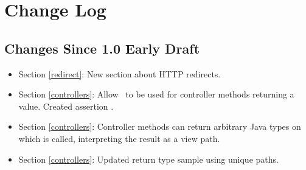 \chapter{Change Log}

\section{Changes Since 1.0 Early Draft}

\begin{itemize}
\item Section \ref{redirect}: New section about HTTP redirects.
\item Section \ref{controllers}: Allow \View\ to be used for controller methods returning a 
 value. Created assertion .
\item Section \ref{controllers}: Controller methods can return arbitrary Java types on which  is called, interpreting the result as a view path.
\item Section \ref{controllers}: Updated return type sample using unique paths.
\end{itemize}
